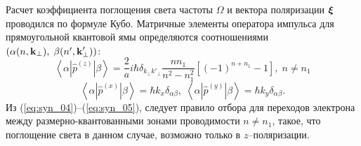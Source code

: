 Расчет коэффициента поглощения света частоты $\Omega$ и вектора поляризации $\boldsymbol{\mathbf{\xi}}$ проводился по формуле Кубо.
Матричные элементы оператора импульса  для прямоугольной квантовой ямы определяются соотношениями $(\alpha (n, \boldsymbol{\mathbf{k}}{_\bot}), \; \beta (n', \boldsymbol{\mathbf{k}}'_{\bot}))$:
\begin{equation} \label{eq:syn_04}
\left\langle \alpha \left| \hat{p}^{(z)} \right| \beta \right\rangle = \frac{2}{a} i\hbar \delta_{k_\bot k'_\bot} \frac{n n_1}{n^2 - n_1^2} \left[(-1)^{n+n_1} -1 \right] , \; n \neq n_1
\end{equation}
\begin{equation} \label{eq:syn_05}
\left\langle \alpha \left| \hat{p}^{(x)} \right| \beta \right\rangle = \hbar k_x \delta_{\alpha\beta},\;
\left\langle \alpha \left| \hat{p}^{(y)} \right| \beta \right\rangle = \hbar k_y \delta_{\alpha\beta}.
\end{equation} 
Из (\ref{eq:syn_04})--(\ref{eq:syn_05}), следует правило отбора для переходов электрона между размерно-квантованными зонами проводимости $n \neq n_1$, такое, что поглощение света в данном случае, возможно только в $z$–поляризации.

